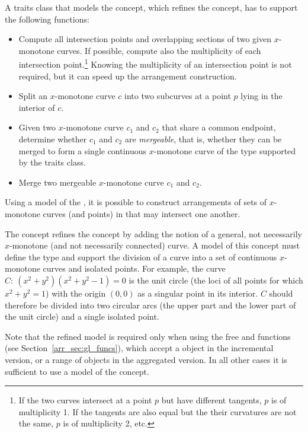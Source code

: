 A traits class that models the 
concept, which refines the 
concept, has to support the following functions:
\begin{itemize}
\item Compute all intersection points and overlapping sections of
two given $x$-monotone curves. If possible, compute also the
multiplicity of each intersection point.\footnote{If the two
curves intersect at a point $p$ but have different tangents, $p$
is of multiplicity 1. If the tangents are also equal but the their
curvatures are not the same, $p$ is of multiplicity 2, etc.}
Knowing the multiplicity of an intersection point is not required,
but it can speed up the arrangement construction.
\item Split an $x$-monotone curve $c$ into two subcurves at a point
$p$ lying in the interior of $c$.
\item Given two $x$-monotone curve $c_1$ and $c_2$ that share a
common endpoint, determine whether $c_1$ and $c_2$ are {\em
mergeable}, that is, whether they can be merged to form a
single continuous $x$-monotone curve of the type supported by the
traits class.
\item Merge two mergeable $x$-monotone curve $c_1$ and $c_2$.
\end{itemize}
Using a model of the , it is
possible to construct arrangements of sets of $x$-monotone curves
(and points) in that may intersect one another.

The concept  refines the
 concept by adding the notion
of a general, not necessarily $x$-monotone (and not necessarily
connected) curve. A model of this concept must define the
 type and support the division of a curve into a
set of continuous $x$-monotone curves and isolated points. For
example, the curve $C:\ (x^2 + y^2)(x^2 + y^2 - 1) = 0$ is the
unit circle (the loci of all points for which $x^2 + y^2  = 1$)
with the origin $(0,0)$ as a singular point in its interior. $C$
should therefore be divided into two circular arcs (the upper
part and the lower part of the unit circle) and a single isolated
point.

Note that the refined model  is required
only when using the free  and
 functions (see Section~\ref{arr_sec:gl_funcs}),
which accept a  object in the incremental version,
or a range of  objects in the aggregated version.
In all other cases it is sufficient to use a model of the
 concept.

